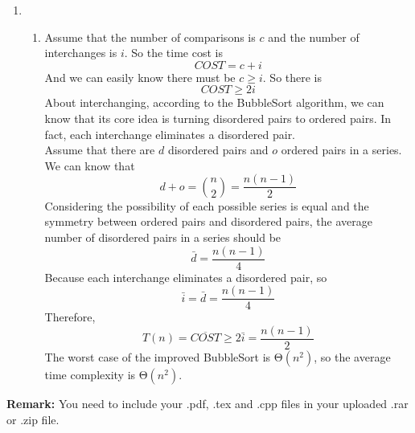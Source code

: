 \documentclass[12pt,a4paper]{article}
\makeatletter
\newtheorem*{solution}{Solution}
\theoremstyle{definition}
\renewenvironment{solution}[1][Solution] {\par\pushQED{\qed}\normalfont\topsep6\p@\@plus6\p@\relax\trivlist\item[\hskip\labelsep\bfseries#1\@addpunct{.}]\ignorespaces}{\popQED\endtrivlist\@endpefalse} \makeatother
\makeatother
\begin{document}
\begin{enumerate}
\begin{solution}
\begin{enumerate}
    		\item Assume that the number of comparisons is $c$ and the number of interchanges is $i$. So the time cost is
    		\[COST = c + i
    		\]
    		And we can easily know there must be $c \geq i$. So there is
    		\[COST \geq 2i
    		\]
    		About interchanging, according to the BubbleSort algorithm, we can know that its core idea is turning disordered pairs to ordered pairs.
    		In fact, each interchange eliminates a disordered pair.\\
    		Assume that there are $d$ disordered pairs and $o$ ordered pairs in a series. We can know that
    		\[ d + o = \binom{n}{2} = \frac{n(n-1)}{2}
    		\]
    		Considering the possibility of each possible series is equal and the symmetry between ordered pairs and disordered pairs, the average number of disordered pairs in a series should be
    		\[\bar{d} = \frac{n(n-1)}{4}
    		\]
    		Because each interchange eliminates a disordered pair, so
    		\[\bar{i}=\bar{d} = \frac{n(n-1)}{4}
    		\]
    		Therefore,
    		\[T(n) = \overline{COST} \geq 2\bar{i} = \frac{n(n-1)}{2}
    		\]
    		The worst case of the improved BubbleSort is Θ$(n^2)$, so the average time complexity is Θ$(n^2)$.
    		
    	
    	\end{enumerate}
    \end{solution}

\end{enumerate}

\vspace{20pt}

\textbf{Remark:} You need to include your .pdf, .tex and .cpp files in your uploaded .rar or .zip file.

\end{document}

